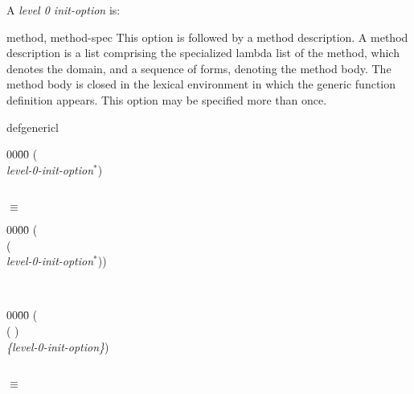 \begin{optDefinition}
A {\em level 0 init-option\/} is:
\begin{options}
    \item[method, method-spec] This option is followed by a method description.
    A method description is a list comprising the specialized lambda list of the
    method, which denotes the domain, and a sequence of forms, denoting the
    method body.  The method body is closed in the lexical environment in which
    the generic function definition appears. This option may be specified more
    than once.
\end{options}
%
\rewriterules
\label{defgeneric-rewrite-rules}
%
%
\begin{RewriteTable}{defgeneric}{l}
\begin{minipage}[t]{\linewidth}
    \begin{tabbing}
        00\=00\= \kill
        ( \identifier \\
         {\em level-0-init-option$^*$})
    \end{tabbing}
\end{minipage}\\
\hspace{2cm}$\equiv$
\begin{minipage}[t]{\linewidth}
    \begin{tabbing}
        00\=00\= \kill
        ( \identifier\\
        \>( \\
        \> {\em level-0-init-option$^*$}))
    \end{tabbing}
\end{minipage}\\
%
\begin{minipage}[t]{\linewidth}
    \begin{tabbing}
        00\=00\= \kill
        ( \\
        \>( \identifier) \\
         {\em \{level-0-init-option\}})
    \end{tabbing}
\end{minipage}\\
\hspace{2cm}$\equiv$
\begin{minipage}[t]{\linewidth}
    \begin{tabbing}

\end{tabbing}
\end{minipage}
\end{RewriteTable}
\end{optDefinition}
